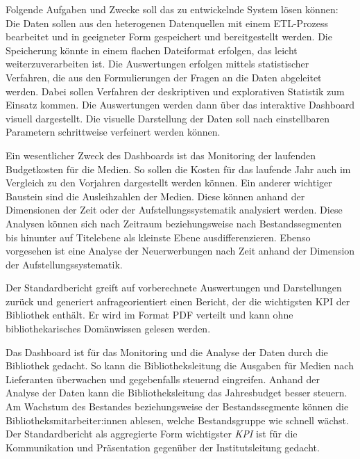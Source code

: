 Folgende Aufgaben und Zwecke soll das zu entwickelnde System lösen können:
Die Daten sollen aus den heterogenen Datenquellen mit einem \acrfull{ETL}-Prozess bearbeitet und in
geeigneter Form gespeichert und bereitgestellt werden. Die Speicherung könnte in einem flachen Dateiformat erfolgen, das leicht
weiterzuverarbeiten ist. Die Auswertungen erfolgen mittels statistischer Verfahren, 
die aus den Formulierungen der Fragen an die Daten abgeleitet werden. Dabei sollen Verfahren der deskriptiven und explorativen Statistik zum Einsatz kommen.
Die Auswertungen werden dann über das interaktive Dashboard visuell dargestellt.
Die visuelle Darstellung der Daten soll nach einstellbaren Parametern schrittweise verfeinert werden können.

Ein wesentlicher Zweck des Dashboards ist das Monitoring der laufenden Budgetkosten für die Medien. So sollen die Kosten für das laufende Jahr auch im Vergleich zu den
Vorjahren dargestellt werden können. Ein anderer wichtiger Baustein sind die Ausleihzahlen der Medien. Diese können
anhand der Dimensionen der Zeit oder der Aufstellungssystematik analysiert werden. Diese Analysen können sich 
nach Zeitraum beziehungsweise nach Bestandssegmenten bis hinunter auf Titelebene als kleinste Ebene ausdifferenzieren. 
Ebenso vorgesehen ist eine Analyse der Neuerwerbungen nach Zeit anhand der Dimension der Aufstellungssystematik.

Der Standardbericht greift auf vorberechnete Auswertungen und Darstellungen zurück und generiert anfrageorientiert einen Bericht, der die wichtigsten 
\acrfull{KPI} der Bibliothek enthält. Er wird im Format PDF verteilt und kann ohne bibliothekarisches Domänwissen gelesen werden.

Das Dashboard ist für das Monitoring und die Analyse der Daten durch die Bibliothek gedacht. 
So kann die Bibliotheksleitung die Ausgaben für Medien nach Lieferanten überwachen und gegebenfalls steuernd eingreifen.
Anhand der Analyse der Daten kann die Bibliotheksleitung das Jahresbudget besser steuern.
Am Wachstum des Bestandes beziehungsweise der Bestandssegmente können die Bibliotheksmitarbeiter:innen ablesen, welche Bestandsgruppe
wie schnell wächst.
Der Standardbericht als aggregierte Form wichtigster \textit{\acrshort{KPI}} ist für die Kommunikation und Präsentation gegenüber der Institutsleitung gedacht.

